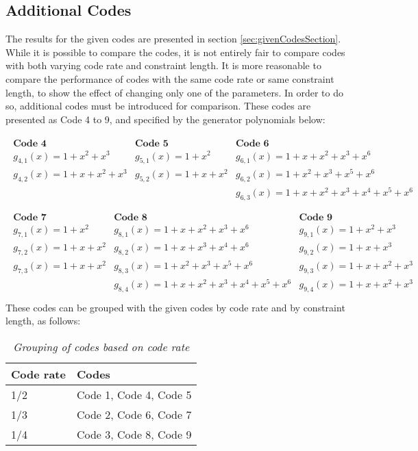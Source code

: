 \subsection{Additional Codes}
The results for the given codes are presented in section \ref{sec:givenCodesSection}. While it is possible to compare the codes, it is not entirely fair to compare codes with both varying code rate and constraint length. It is more reasonable to compare the performance of codes with the same code rate or same constraint length, to show the effect of changing only one of the parameters.
In order to do so, additional codes must be introduced for comparison. These codes are presented as Code 4 to 9, and specified by the generator polynomials below:

\begin{align*}
\begin{matrix}
\textbf{Code 4}&\textbf{Code 5}&\textbf{Code 6}\\
g_{4,1}(x) = 1 + x^2 + x^3&g_{5,1}(x) = 1 + x^2&g_{6,1}(x)=1 + x + x^2 + x^3 + x^6\\
g_{4,2}(x) = 1+x+x^2+x^3&g_{5,2}(x) = 1+x+x^2&g_{6,2}(x)=1 + x^2 + x^3 + x^5 + x^6\\
&&g_{6,3}(x)=1 + x + x^2 + x^3 + x^4 + x^5 + x^6\\
\end{matrix}\\
\begin{matrix}
\textbf{Code 7}&\textbf{Code 8}&\textbf{Code 9}\\
g_{7,1}(x) = 1 + x^2&g_{8,1}(x) = 1 + x + x^2 + x^3 + x^6&g_{9,1}(x)=1 + x^2 + x^3\\
g_{7,2}(x) = 1+x+x^2&g_{8,2}(x) = 1 + x + x^3 + x^4 + x^6&g_{9,2}(x)=1 + x + x^3\\
g_{7,3}(x) = 1+x+x^2&g_{8,3}(x) = 1 + x^2 + x^3 + x^5 + x^6&g_{9,3}(x)=1+x+x^2+x^3\\
&g_{8,4}(x) = 1 + x + x^2 + x^3 + x^4 + x^5 + x^6&g_{9,4}(x)=1+x+x^2+x^3\\
\end{matrix}
\end{align*}
These codes can be grouped with the given codes by code rate and by constraint length, as follows:
\begin{table}[h]
\centering
\begin{tabular}{ll}
\hline
Code rate &  Codes \\ \hline
1/2 & Code 1, Code 4, Code 5 \\
1/3 & Code 2, Code 6, Code 7 \\
1/4 & Code 3, Code 8, Code 9 \\
\end{tabular}
\caption{\textit{Grouping of codes based on code rate}\label{tab:codeRate}}
\end{table}

